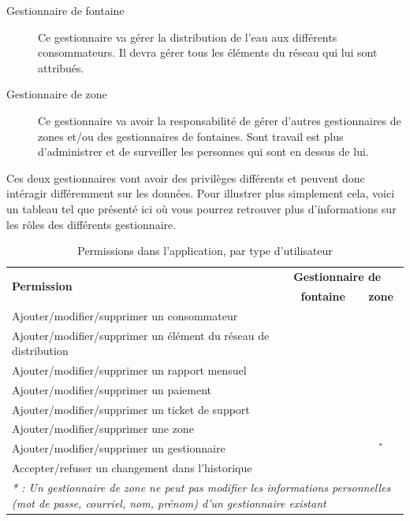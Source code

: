 \documentclass{EPL-master-thesis-covers-FR}
\newcommand{\cmark}{\ding{51}}%
\newcommand{\xmark}{\ding{55}}%
\begin{document}
				\begin{description}
					\item[Gestionnaire de fontaine] Ce gestionnaire va gérer la distribution de l'eau aux différents consommateurs. Il devra gérer tous les éléments du réseau qui lui sont attribués.
					\item[Gestionnaire de zone] Ce gestionnaire va avoir la responsabilité de gérer d'autres gestionnaires de zones et/ou des gestionnaires de fontaines. Sont travail est plus d'administrer et de surveiller les personnes qui sont en dessus de lui.			 
				\end{description}
				
				Ces deux gestionnaires vont avoir des privilèges différents et peuvent donc intéragir différemment sur les données. Pour illustrer plus simplement cela, voici un tableau tel que présenté ici \cite{ref:haitiwater} où vous pourrez retrouver plus d'informations sur les rôles des différents gestionnaire. 
				\begin{table}[H]
					\centering
					\small
					\setlength\tabcolsep{2pt}
					\begin{tabular}{|l|c|c|}
						\hline
						\multirow{2}{*}{\textbf{Permission}} & \multicolumn{2}{l|}{\textbf{Gestionnaire de}} \\ \cline{2-3}
						 & \textbf{fontaine} & \textbf{zone} \\ \hline
						 Ajouter/modifier/supprimer un consommateur & \cmark & \cmark \\ \hline
						 Ajouter/modifier/supprimer un élément du réseau de distribution & \cmark & \cmark \\ \hline
						 Ajouter/modifier/supprimer un rapport mensuel & \cmark & \cmark \\ \hline
						 Ajouter/modifier/supprimer un paiement & \cmark & \cmark \\ \hline
						 Ajouter/modifier/supprimer un ticket de support & \cmark & \cmark \\ \hline
						 Ajouter/modifier/supprimer une zone & \xmark & \cmark \\ \hline
						 Ajouter/modifier/supprimer un gestionnaire & \xmark & \cmark$^{*}$ \\ \hline
						 Accepter/refuser un changement dans l'historique & \xmark & \cmark \\ \hline
						 \multicolumn{3}{p{\textwidth}}{\emph{* : Un gestionnaire de zone ne peut pas modifier les informations personnelles (mot de passe, courriel, nom, prénom) d'un gestionnaire existant}} \\
					\end{tabular}
					\caption{Permissions dans l'application, par type d'utilisateur}
					\label{tab:permissions}
				\end{table}
				
\end{document}
